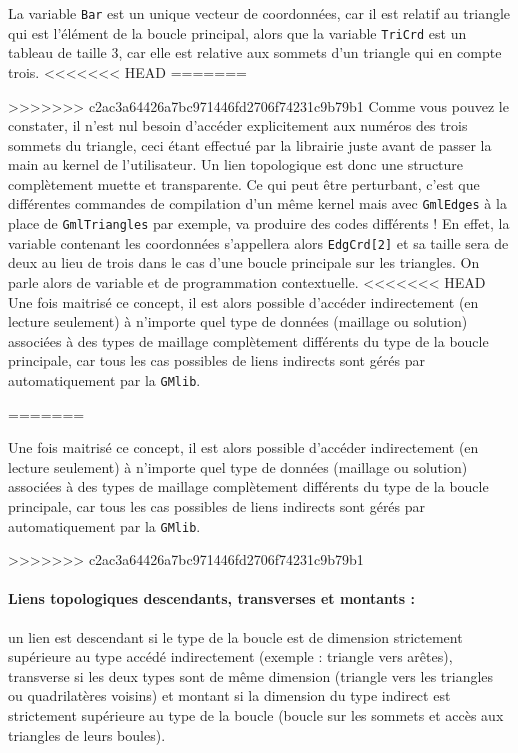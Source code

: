 \documentclass[a4paper,12pt]{article}
\begin{document}
La variable {\tt Bar} est un unique vecteur de coordonnées, car il est relatif au triangle qui est l'élément de la boucle principal, alors que la variable {\tt TriCrd} est un tableau de taille 3, car elle est relative aux sommets d'un triangle qui en compte trois.
<<<<<<< HEAD
=======

>>>>>>> c2ac3a64426a7bc971446fd2706f74231c9b79b1
Comme vous pouvez le constater, il n'est nul besoin d'accéder explicitement aux numéros des trois sommets du triangle, ceci étant effectué par la librairie juste avant de passer la main au kernel de l'utilisateur.
Un lien topologique est donc une structure complètement muette et transparente.
Ce qui peut être perturbant, c'est que différentes commandes de compilation d'un même kernel mais avec {\tt GmlEdges} à la place de {\tt GmlTriangles} par exemple, va produire des codes différents !
En effet, la variable contenant les coordonnées s'appellera alors {\tt EdgCrd[2]} et sa taille sera de deux au lieu de trois dans le cas d'une boucle principale sur les triangles.
On parle alors de variable et de programmation contextuelle.
<<<<<<< HEAD
Une fois maitrisé ce concept, il est alors possible d'accéder indirectement (en lecture seulement) à n'importe quel type de données (maillage ou solution) associées à des types de maillage complètement différents du type de la boucle principale, car tous les cas possibles de liens indirects sont gérés par automatiquement par la {\tt GMlib}.

=======

Une fois maitrisé ce concept, il est alors possible d'accéder indirectement (en lecture seulement) à n'importe quel type de données (maillage ou solution) associées à des types de maillage complètement différents du type de la boucle principale, car tous les cas possibles de liens indirects sont gérés par automatiquement par la {\tt GMlib}.

>>>>>>> c2ac3a64426a7bc971446fd2706f74231c9b79b1
\paragraph{Liens topologiques descendants, transverses et montants :} un lien est descendant si le type de la boucle est de dimension strictement supérieure au type accédé indirectement (exemple : triangle vers arêtes), transverse si les deux types sont de même dimension (triangle vers les triangles ou quadrilatères voisins) et montant si la dimension du type indirect est strictement supérieure au type de la boucle (boucle sur les sommets et accès aux triangles de leurs boules).
\end{document}
